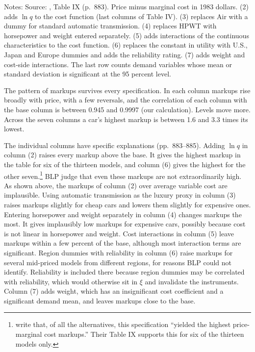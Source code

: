 \begin{table}[htbp]
\smallskip
\begin{minipage}{0.97\linewidth}
\footnotesize
Notes: Source: \citet{BerryLevinsohnPakes1995}, Table IX (p.~883). Price minus marginal cost in
1983 dollars. (2) adds $\ln q$ to the cost function (last columns of Table IV). (3) replaces Air with a
dummy for standard automatic transmission. (4) replaces HPWT with horsepower and weight entered
separately. (5) adds interactions of the continuous characteristics to the cost function. (6) replaces
the constant in utility with U.S., Japan and Europe dummies and adds the reliability rating. (7) adds
weight and cost-side interactions. The last row counts demand variables whose mean or standard
deviation is significant at the 95 percent level.
\end{minipage}
\end{table}

The pattern of markups survives every specification. In each column markups rise broadly with price, with a few
reversals, and the correlation of each column with the base column is between 0.945 and 0.9997 (our calculation). Levels
move more. Across the seven columns a car's highest markup is between 1.6 and 3.3 times its lowest.

The individual columns have specific explanations (pp.~883--885). Adding $\ln q$ in column (2) raises
every markup above the base. It gives the highest markup in the table for six of the thirteen models,
and column (6) gives the highest for the other seven.\footnote{\citet[pp.~883--884]{BerryLevinsohnPakes1995}
write that, of all the alternatives, this specification ``yielded the highest price-marginal cost
markups.'' Their Table IX supports this for six of the thirteen models only.} BLP judge that even these
markups are not extraordinarily high. As shown above, the markups of column (2) over average variable
cost are implausible. Using
automatic transmission as the luxury proxy in column (3) raises markups slightly for cheap cars and lowers
them slightly for expensive ones. Entering horsepower and weight separately in column (4) changes markups
the most. It gives implausibly low markups for expensive cars, possibly because cost is not linear in
horsepower and weight. Cost interactions in column (5) leave markups within a few percent of the base,
although most interaction terms are significant. Region dummies with reliability in column (6) raise
markups for several mid-priced models from different regions, for reasons BLP could not identify.
Reliability is included there because region dummies may be correlated with reliability, which would
otherwise sit in $\xi$ and invalidate the instruments. Column (7) adds weight, which has an
insignificant cost coefficient and a significant demand mean, and leaves markups close to the base.

